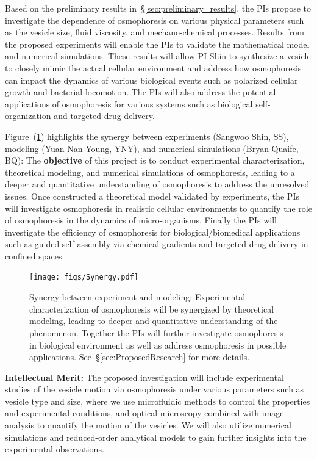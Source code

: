 \documentclass[11pt]{article}
\begin{document}
Based on the preliminary results in~\S\ref{sec:preliminary_results}, the
PIs propose to investigate the dependence of osmophoresis on various
physical parameters such as the vesicle size, fluid viscosity, and
mechano-chemical processes.  Results from the proposed experiments will
enable the PIs to validate the mathematical model and numerical
simulations.  These results will allow PI Shin to synthesize a vesicle
to closely mimic the actual cellular environment and address how
osmophoresis can impact the dynamics of various biological events such
as polarized cellular growth and bacterial locomotion.  The PIs will
also address the potential applications of osmophoresis for various
systems such as biological self-organization and targeted drug delivery.

Figure~(\ref{fig:synergy}) highlights the synergy between experiments
(Sangwoo Shin, SS), modeling (Yuan-Nan Young, YNY), and numerical
simulations (Bryan Quaife, BQ): The {\bf objective} of this project is
to conduct experimental characterization, theoretical modeling, and
numerical simulations of osmophoresis, leading to a deeper and
quantitative understanding of osmophoresis to address the unresolved
issues.  Once constructed a theoretical model validated by experiments,
the PIs will investigate osmophoresis in realistic cellular environments
to quantify the role of osmophoresis in the dynamics of micro-organisms.
Finally the PIs will investigate the efficiency of osmophoresis for
biological/biomedical applications such as guided self-assembly via
chemical gradients and targeted drug delivery in confined spaces.
%
\begin{figure}[h]
\begin{center}
\texttt{[image: figs/Synergy.pdf]}
\caption{Synergy between experiment and modeling: Experimental
  characterization of osmophoresis will be synergized by theoretical
  modeling, leading to deeper and quantitative understanding of the
  phenomenon. Together the PIs will  further  investigate osmophoresis
  in biological environment as well as address osmophoresis in possible
  applications. See~\S\ref{sec:ProposedResearch} for more details.}
\label{fig:synergy}
\end{center}
\end{figure}

\noindent
{\bf Intellectual Merit:}
The proposed investigation will include experimental studies of the
vesicle motion via osmophoresis under various parameters such as vesicle
type and size, where we use microfluidic methods to control the
properties and experimental conditions, and optical microscopy combined
with image analysis to quantify the motion of the vesicles. We will also
utilize numerical simulations and reduced-order analytical models to
gain further insights into the experimental observations.
\end{document}
